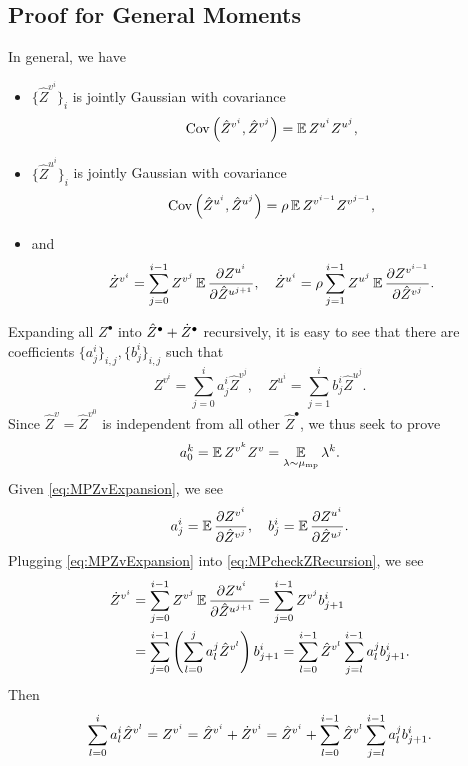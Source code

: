 \documentclass[main.tex]{subfiles}
\begin{document}
\subsection{Proof for General Moments}

In general, we have
\begin{itemize}
\item $\{\hat{Z}^{v^{i}}\}_{i}$ is jointly Gaussian with covariance
\[
\operatorname{Cov}\left(\hat{Z}^{v^{i}},\hat{Z}^{v^{j}}\right)=\operatorname*{\mathbb{E}} Z^{u^{i}}Z^{u^{j}},
\]
\item $\{\hat{Z}^{u^{i}}\}_{i}$ is jointly Gaussian with covariance
\[
\operatorname{Cov}\left(\hat{Z}^{u^{i}},\hat{Z}^{u^{j}}\right)=\rho\operatorname*{\mathbb{E}} Z^{v^{i-1}}Z^{v^{j-1}},
\]
\item and
\begin{equation}
\Zdot^{v^{i}}=\sum_{j=0}^{i-1}Z^{v^{j}}\EV\frac{\partial Z^{u^{i}}}{\partial\hat{Z}^{u^{j+1}}},\quad\Zdot^{u^{i}}=\rho\sum_{j=1}^{i-1}Z^{u^{j}}\EV\frac{\partial Z^{v^{i-1}}}{\partial\hat{Z}^{v^{j}}}.\label{eq:MPcheckZRecursion}
\end{equation}
\end{itemize}
Expanding all $Z^{\bullet}$ into $\hat{Z}^{\bullet}+\dot Z^{\bullet}$ recursively, it is easy to see that there are coefficients $\{a_{j}^{i}\}_{i,j},\{b_{j}^{i}\}_{i,j}$ such that
\begin{equation}
Z^{v^{i}}=\sum_{j=0}^{i}a_{j}^{i}\hat{Z}^{v^{j}},\quad Z^{u^{i}}=\sum_{j=1}^{i}b_{j}^{i}\hat{Z}^{u^{j}}.\label{eq:MPZvExpansion}
\end{equation}
Since $\hat{Z}^{v}=\hat{Z}^{v^{0}}$ is independent from all other $\hat{Z}^{\bullet}$, we thus seek to prove
\[
a_{0}^{k}=\operatorname*{\mathbb{E}} Z^{v^{k}}Z^{v}=\operatorname*{\mathbb{E}}_{\lambda\sim\mu_{\mathrm{mp}}}\lambda^{k}.
\]
Given \cref{eq:MPZvExpansion}, we see
\[
a_{j}^{i}=\operatorname*{\mathbb{E}}\frac{\partial Z^{v^{i}}}{\partial\hat{Z}^{v^{j}}},\quad b_{j}^{i}=\operatorname*{\mathbb{E}}\frac{\partial Z^{u^{i}}}{\partial\hat{Z}^{u^{j}}}.
\]
Plugging \cref{eq:MPZvExpansion} into \cref{eq:MPcheckZRecursion}, we see
\begin{align*}
\dot Z^{v^{i}} & =\sum_{j=0}^{i-1}Z^{v^{j}}\operatorname*{\mathbb{E}}\frac{\partial Z^{u^{i}}}{\partial\hat{Z}^{u^{j+1}}}=\sum_{j=0}^{i-1}Z^{v^{j}}b_{j+1}^{i}\\
 & =\sum_{j=0}^{i-1}\left(\sum_{l=0}^{j}a_{l}^{j}\hat{Z}^{v^{l}}\right)b_{j+1}^{i}=\sum_{l=0}^{i-1}\hat{Z}^{v^{l}}\sum_{j=l}^{i-1}a_{l}^{j}b_{j+1}^{i}.
\end{align*}
Then 
\[
\sum_{l=0}^{i}a_{l}^{i}\hat{Z}^{v^{l}}=Z^{v^{i}}=\hat{Z}^{v^{i}}+\dot Z^{v^{i}}=\hat{Z}^{v^{i}}+\sum_{l=0}^{i-1}\hat{Z}^{v^{l}}\sum_{j=l}^{i-1}a_{l}^{j}b_{j+1}^{i}.
\]
\end{document}
